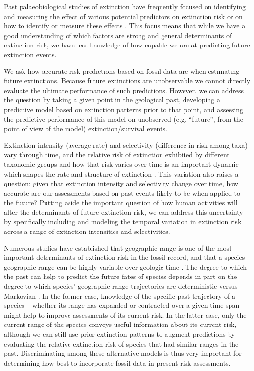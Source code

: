 \documentclass[12pt,letterpaper]{article}
\begin{document}
\begin{refsection}
Past palaeobiological studies of extinction have frequently focused on identifying and measuring the effect of various potential predictors on extinction risk \citep{Harnik2011,Smits2015,Peters2008,Payne2007,Harnik2012,Ezard2011,Foote2006} or on how to identify or measure these effects \citep{Alroy2010a,Alroy2014,Alroy2001,Alroy2000,Alroy2000b,Foote2001}. This focus means that while we have a good understanding of which factors are strong and general determinants of extinction risk, we have less knowledge of how capable we are at predicting future extinction events.

We ask how accurate risk predictions based on fossil data are when estimating future extinctions. Because future extinctions are unobservable we cannot directly evaluate the ultimate performance of such predictions. However, we can address the question by taking a given point in the geological past, developing a predictive model based on extinction patterns prior to that point, and assessing the predictive performance of this model on unobserved (e.g. ``future'', from the point of view of the model) extinction/survival events.

Extinction intensity (average rate) and selectivity (difference in risk among taxa) vary through time, and the relative risk of extinction exhibited by different taxonomic groups and how that risk varies over time is an important dynamic which shapes the rate and structure of extinction \citep{Payne2007,Payne2016,Ezard2011,Smits2019}. This variation also raises a question: given that extinction intensity and selectivity change over time, how accurate are our assessments based on past events likely to be when applied to the future? Putting aside the important question of how human activities will alter the determinants of future extinction risk, we can address this uncertainty by specifically including and modeling the temporal variation in extinction risk across a range of extinction intensities and selectivities.

Numerous studies have established that geographic range is one of the most important determinants of extinction risk in the fossil record, and that a species geographic range can be highly variable over geologic time \citep{Foote2007,Liow2010,Liow2007,Kiessling2013,Payne2007,Jablonski2003,Jablonski2008,Jablonski2006}. The degree to which the past can help to predict the future fates of species depends in part on the degree to which species’ geographic range trajectories are deterministic versus Markovian \citep{Liow2007,Kiessling2013,Foote2007b,Pigot2012}. In the former case, knowledge of the specific past trajectory of a species -- whether its range has expanded or contracted over a given time span -- might help to improve assessments of its current risk. In the latter case, only the current range of the species conveys useful information about its current risk, although we can still use prior extinction patterns to augment predictions by evaluating the relative extinction risk of species that had similar ranges in the past. Discriminating among these alternative models is thus very important for determining how best to incorporate fossil data in present risk assessments.


\end{refsection}
\end{document}
